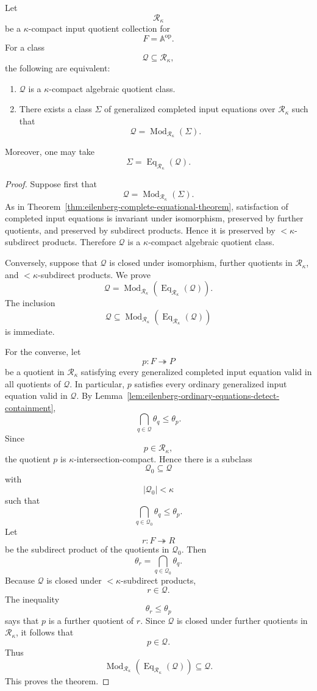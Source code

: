 \begin{theorem}
\label{thm:eilenberg-reiterman-intersection-compact}
Let
\[
\mathcal R_\kappa
\]
be a \(\kappa\)-compact input quotient collection for
\[
F=\mathbb A^{\mathrm{op}}.
\]
For a class
\[
\mathcal Q\subseteq\mathcal R_\kappa,
\]
the following are equivalent:
\begin{enumerate}
\item \(\mathcal Q\) is a \(\kappa\)-compact algebraic quotient class.
\item There exists a class \(\Sigma\) of generalized completed input equations
over \(\mathcal R_\kappa\) such that
\[
\mathcal Q=\operatorname{Mod}_{\mathcal R_\kappa}(\Sigma).
\]
\end{enumerate}
Moreover, one may take
\[
\Sigma=\operatorname{Eq}_{\mathcal R_\kappa}(\mathcal Q).
\]
\end{theorem}

\begin{proof}
Suppose first that
\[
\mathcal Q=\operatorname{Mod}_{\mathcal R_\kappa}(\Sigma).
\]
As in Theorem~\ref{thm:eilenberg-complete-equational-theorem}, satisfaction
of completed input equations is invariant under isomorphism, preserved by
further quotients, and preserved by subdirect products. Hence it is preserved
by \(<\kappa\)-subdirect products. Therefore \(\mathcal Q\) is a
\(\kappa\)-compact algebraic quotient class.

Conversely, suppose that \(\mathcal Q\) is closed under isomorphism, further
quotients in \(\mathcal R_\kappa\), and \(<\kappa\)-subdirect products. We
prove
\[
\mathcal Q
=
\operatorname{Mod}_{\mathcal R_\kappa}
(\operatorname{Eq}_{\mathcal R_\kappa}(\mathcal Q)).
\]
The inclusion
\[
\mathcal Q
\subseteq
\operatorname{Mod}_{\mathcal R_\kappa}
(\operatorname{Eq}_{\mathcal R_\kappa}(\mathcal Q))
\]
is immediate.

For the converse, let
\[
p:F\twoheadrightarrow P
\]
be a quotient in \(\mathcal R_\kappa\) satisfying every generalized completed
input equation valid in all quotients of \(\mathcal Q\). In particular, \(p\)
satisfies every ordinary generalized input equation valid in \(\mathcal Q\).
By Lemma~\ref{lem:eilenberg-ordinary-equations-detect-containment},
\[
\bigcap_{q\in\mathcal Q}\theta_q
\leq
\theta_p.
\]
Since
\[
p\in\mathcal R_\kappa,
\]
the quotient \(p\) is \(\kappa\)-intersection-compact. Hence there is a
subclass
\[
\mathcal Q_0\subseteq\mathcal Q
\]
with
\[
|\mathcal Q_0|<\kappa
\]
such that
\[
\bigcap_{q\in\mathcal Q_0}\theta_q
\leq
\theta_p.
\]
Let
\[
r:F\twoheadrightarrow R
\]
be the subdirect product of the quotients in \(\mathcal Q_0\). Then
\[
\theta_r
=
\bigcap_{q\in\mathcal Q_0}\theta_q.
\]
Because \(\mathcal Q\) is closed under \(<\kappa\)-subdirect products,
\[
r\in\mathcal Q.
\]
The inequality
\[
\theta_r\leq\theta_p
\]
says that \(p\) is a further quotient of \(r\). Since \(\mathcal Q\) is
closed under further quotients in \(\mathcal R_\kappa\), it follows that
\[
p\in\mathcal Q.
\]
Thus
\[
\operatorname{Mod}_{\mathcal R_\kappa}
(\operatorname{Eq}_{\mathcal R_\kappa}(\mathcal Q))
\subseteq
\mathcal Q.
\]
This proves the theorem.
\end{proof}

